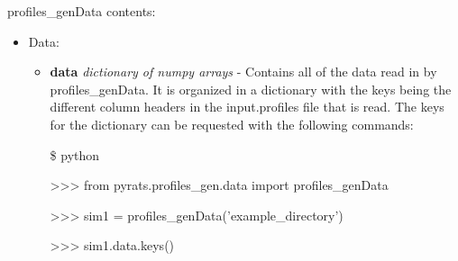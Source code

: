 \documentclass{article}
\begin{document}
\newpage

profiles\_genData contents:
\begin{itemize}
\item Data:
\begin{itemize}
\item \textbf{data} \emph{dictionary of numpy arrays} - Contains all of the data read in by profiles\_genData.  It is organized in a dictionary with the keys being the different column headers in the input.profiles file that is read.  The keys for the dictionary can be requested with the following commands:
\fontfamily{\ttdefault}\selectfont

\$ python

>>> from pyrats.profiles\_gen.data import profiles\_genData

>>> sim1 = profiles\_genData('example\_directory')

>>> sim1.data.keys()


\end{itemize}
\end{itemize}
\end{document}
